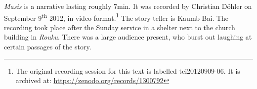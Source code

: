 \textit{Masis} is a narrative lasting roughly 7min. It was recorded by Christian Döhler on September 9\textsuperscript{th} 2012, in video format.\footnote{The original recording session for this text is labelled tci20120909-06. It is archived at: \href{https://zenodo.org/records/1300792}{https://zenodo.org/records/1300792}} The story teller is Kaumb Bai. The recording took place after the Sunday service in a shelter next to the church building in \textit{Rouku}. There was a large audience present, who burst out laughing at certain passages of the story.